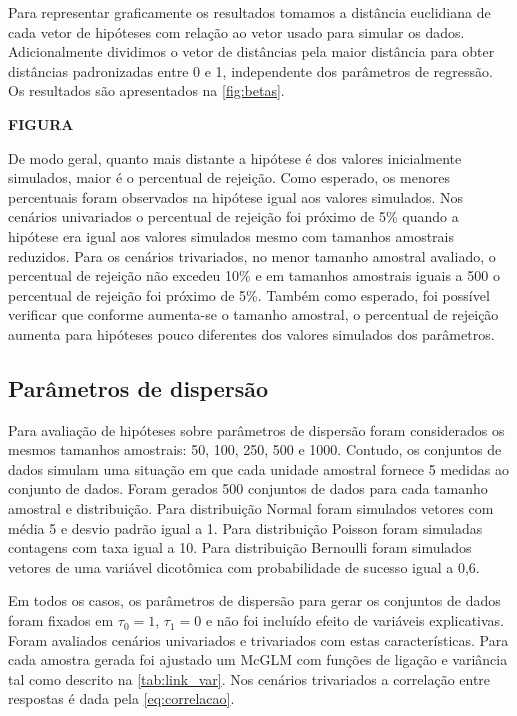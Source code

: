 \documentclass[AMA,STIX1COL]{WileyNJD-v2}
\begin{document}
Para representar graficamente os resultados tomamos a distância euclidiana de cada vetor de hipóteses com relação ao vetor usado para simular os dados. Adicionalmente dividimos o vetor de distâncias pela maior distância para obter distâncias padronizadas entre 0 e 1, independente dos parâmetros de regressão. Os resultados são apresentados na \autoref{fig:betas}.

\textbf{FIGURA}

De modo geral, quanto mais distante a hipótese é dos valores inicialmente simulados, maior é o percentual de rejeição. Como esperado, os menores percentuais foram observados na hipótese igual aos valores simulados. Nos cenários univariados o percentual de rejeição foi próximo de 5\% quando a hipótese era igual aos valores simulados mesmo com tamanhos amostrais reduzidos. Para os cenários trivariados, no menor tamanho amostral avaliado, o percentual de rejeição não excedeu 10\% e em tamanhos amostrais iguais a 500 o percentual de rejeição foi próximo de 5\%. Também como esperado, foi possível verificar que conforme aumenta-se o tamanho amostral, o percentual de rejeição aumenta para hipóteses pouco diferentes dos valores simulados dos parâmetros.

\subsection{Parâmetros de dispersão}

Para avaliação de hipóteses sobre parâmetros de dispersão foram considerados os mesmos tamanhos amostrais: 50, 100, 250, 500 e 1000. Contudo, os conjuntos de dados simulam uma situação em que cada unidade amostral fornece 5 medidas ao conjunto de dados. Foram gerados 500 conjuntos de dados para cada tamanho amostral e distribuição. Para distribuição Normal foram simulados vetores com média 5 e desvio padrão igual a 1. Para distribuição Poisson foram simuladas contagens com taxa igual a 10. Para distribuição Bernoulli foram simulados vetores de uma variável dicotômica com probabilidade de sucesso igual a 0,6.

Em todos os casos, os parâmetros de dispersão para gerar os conjuntos de dados foram fixados em $\tau_0 = 1$, $\tau_1 = 0$ e não foi incluído efeito de variáveis explicativas. Foram avaliados cenários univariados e trivariados com estas características. Para cada amostra gerada foi ajustado um McGLM com funções de ligação e variância tal como descrito na \autoref{tab:link_var}. Nos cenários trivariados a correlação entre respostas é dada pela \autoref{eq:correlacao}.
\end{document}
